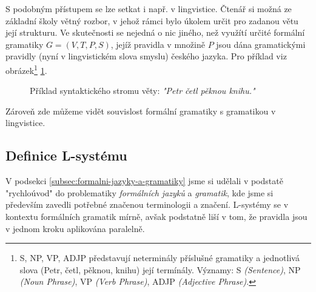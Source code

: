 S podobným přístupem se lze setkat i např. v lingvistice. Čtenář si možná ze základní školy větný rozbor, v jehož rámci bylo úkolem určit pro zadanou větu její strukturu. Ve skutečnosti se nejedná o nic jiného, než využítí určité formální gramatiky $G=(V,T,P,S)$, jejíž pravidla v množině $P$ jsou dána gramatickými pravidly (nyní v lingvistickém slova smyslu) českého jazyka. Pro příklad viz obrázek\footnote{S, NP, VP, ADJP představují neterminály příslušné gramatiky a jednotlivá slova (Petr, četl, pěknou, knihu) její termínály. Významy: S \emph{(Sentence)}, NP \emph{(Noun Phrase)}, VP \emph{(Verb Phrase)}, ADJP \emph{(Adjective Phrase)}.} \ref{fig:syntax-strom-vety}.
\begin{figure}[h]
    \centering
    \caption{Příklad syntaktického stromu věty: \emph{"Petr četl pěknou knihu."}}
    \label{fig:syntax-strom-vety}
\end{figure}
Zároveň zde můžeme vidět souvislost formální gramatiky s gramatikou v lingvistice.

\subsection{Definice L-systému}\label{subsec:definice-lsystemu}

V podsekci \ref{subsec:formalni-jazyky-a-gramatiky} jsme si udělali v podstatě "rychloúvod" do problematiky \emph{formálních jazyků} a \emph{gramatik}, kde jsme si především zavedli potřebné značenou terminologii a značení. L-systémy se v kontextu formálních gramatik mírně, avšak podstatně liší v tom, že pravidla jsou v jednom kroku aplikována paralelně. 